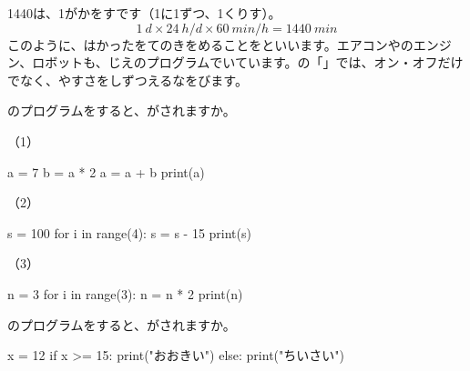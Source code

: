 \begin{butsuri}
\par\addvspace{4pt}
1440は、1がかをすです（1に1ずつ、1くりす）。
\[ \qty{1}{d}\times\qty{24}{h/d}\times\qty{60}{min/h}=\qty{1440}{min} \]
このように、はかったをてのきをめることを\textbf{}といいます。エアコンやのエンジン、ロボットも、じえのプログラムでいています。の「」では、オン・オフだけでなく、やすさをしずつえるなをびます。
\end{butsuri}


\clearpage
\bkendproblems
{}

\bkproblem {}のプログラムをすると、がされますか。
\par\nobreak\vspace{4pt}
\noindent\begin{minipage}[t]{0.31\linewidth}
（1）
\begin{bkiitcode}
a = 7
b = a * 2
a = a + b
print(a)
\end{bkiitcode}
\end{minipage}\hfill
\begin{minipage}[t]{0.33\linewidth}
（2）
\begin{bkiitcode}
s = 100
for i in range(4):
    s = s - 15
print(s)
\end{bkiitcode}
\end{minipage}\hfill
\begin{minipage}[t]{0.31\linewidth}
（3）
\begin{bkiitcode}
n = 3
for i in range(3):
    n = n * 2
print(n)
\end{bkiitcode}
\end{minipage}

\bkproblem {}のプログラムをすると、がされますか。
\par\nobreak\vspace{4pt}
\noindent\begin{minipage}[t]{0.4\linewidth}
\begin{bkiitcode}
x = 12
if x >= 15:
    print("おおきい")
else:
    print("ちいさい")
\end{bkiitcode}
\end{minipage}

